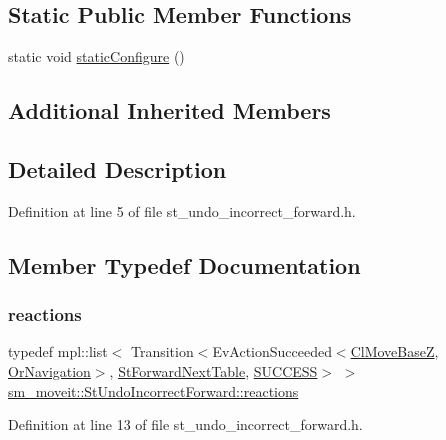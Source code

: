 \subsection*{Static Public Member Functions}
\begin{DoxyCompactItemize}
\item 
static void \hyperlink{structsm__moveit_1_1StUndoIncorrectForward_aaf7b67b7c1c8bdb912877d45ce629bed}{static\+Configure} ()
\end{DoxyCompactItemize}
\subsection*{Additional Inherited Members}


\subsection{Detailed Description}


Definition at line 5 of file st\+\_\+undo\+\_\+incorrect\+\_\+forward.\+h.



\subsection{Member Typedef Documentation}
\mbox{\label{structsm__moveit_1_1StUndoIncorrectForward_a2c215b9ade720f753b2aa4719f96e787}} 
\subsubsection{\texorpdfstring{reactions}{reactions}}
{\footnotesize\ttfamily typedef mpl\+::list$<$ Transition$<$Ev\+Action\+Succeeded$<$\hyperlink{classcl__move__base__z_1_1ClMoveBaseZ}{Cl\+Move\+BaseZ}, \hyperlink{classsm__moveit_1_1OrNavigation}{Or\+Navigation}$>$, \hyperlink{structsm__moveit_1_1StForwardNextTable}{St\+Forward\+Next\+Table}, \hyperlink{classSUCCESS}{S\+U\+C\+C\+E\+SS}$>$ $>$ \hyperlink{structsm__moveit_1_1StUndoIncorrectForward_a2c215b9ade720f753b2aa4719f96e787}{sm\+\_\+moveit\+::\+St\+Undo\+Incorrect\+Forward\+::reactions}}



Definition at line 13 of file st\+\_\+undo\+\_\+incorrect\+\_\+forward.\+h.




